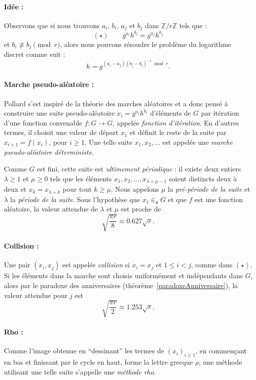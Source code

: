 \documentclass[a4paper, titlepage]{article}
\theoremstyle{definition}
\theoremstyle{remark}
\def\Z{\mathbb Z}
\begin{document}
\paragraph*{Idée :} Observons que si nous trouvons $a_i$, $b_i$, $a_j$ et $b_j$ dans $\Z/r\Z$ tels que :
$$(\star) \qquad g^{a_i}h^{b_i} = g^{a_j}h^{b_j}$$
et $b_i \not\equiv b_j \pmod{r}$, alors nous pouvons résoudre le problème du logarithme discret comme suit : $$h = g^{(a_i-a_j)(b_j-b_i)^{-1}\bmod{r}}.$$

\paragraph*{Marche pseudo-aléatoire :} Pollard \cite{pollard1978} s'est inspiré de la théorie des marches aléatoires et a donc pensé à construire une suite pseudo-aléatoire $x_i = g^{a_i}h^{b_i}$ d'éléments de $G$ par itération d'une fonction convenable $f:G \rightarrow  G$, appelée \textit{fonction d'itération}. En d'autres termes, il choisit une valeur de départ $x_1$ et définit le reste de la suite par $x_{i+1}=f({x_i})$, pour $i \geqslant 1$. Une telle suite $x_1, x_2, \dots$ est appelée une \textit{marche pseudo-aléatoire déterministe}. 

Comme $G$ est fini, cette suite est \textit{ultimement périodique} : il existe deux entiers $\lambda \geqslant 1$ et $\mu \geqslant 0$ tels que les éléments $x_1, x_2, \dots, x_{\lambda + \mu -1}$ soient distincts deux à deux et $x_{k} = x_{\lambda + k}$ pour tout $k\geqslant \mu$. Nous appelons $\mu$ la \textit{pré-période de la suite} et $\lambda$ la \textit{période de la suite}. Sous l'hypothèse que $x_1 \in_\mathfrak{a} G$ et que $f$ est une fonction aléatoire, la valeur attendue de $\lambda$ et $\mu$ est proche de $$\sqrt{\frac{\pi r}{8}} \approx 0.627 \sqrt{r}.$$

\paragraph*{Collision :} Une pair $(x_i, x_j)$ est appelée \textit{collision} si $x_i = x_j$ et $1 \leqslant i < j$, comme dans $(\star)$. Si les éléments dans la marche sont choisis uniformément et indépendants dans $G$, alors par le paradoxe des anniversaires (théorème~\ref{paradoxeAnniversaire}), la valeur attendue pour $j$ est $$\sqrt{\frac{\pi r}{2}} \approx 1.253 \sqrt{r}.$$

\paragraph*{Rho :} Comme l'image obtenue en ``dessinant'' les termes de ${(x_i)}_{i\geqslant 1}$, en commençant en bas et finissant par le cycle en haut, forme la lettre grecque $\rho$, une méthode utilisant une telle suite s'appelle une \textit{méthode rho}.
\end{document}
